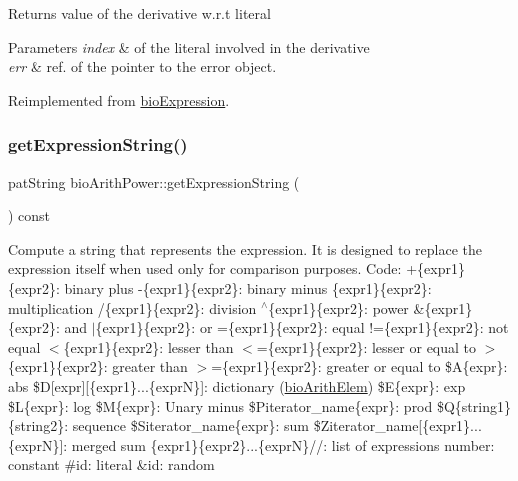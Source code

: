 \begin{DoxyReturn}{Returns}
value of the derivative w.\+r.\+t literal 
\end{DoxyReturn}

\begin{DoxyParams}{Parameters}
{\em index} & of the literal involved in the derivative \\
\hline
{\em err} & ref. of the pointer to the error object. \\
\hline
\end{DoxyParams}


Reimplemented from \hyperlink{classbio_expression_a5915579d1193f25f216c1e273c97f2ce}{bio\+Expression}.

\mbox{\label{classbio_arith_power_a90e7e9f398760b8c8f928ecfb7d7c3d3}} 
\subsubsection{\texorpdfstring{get\+Expression\+String()}{getExpressionString()}}
{\footnotesize\ttfamily pat\+String bio\+Arith\+Power\+::get\+Expression\+String (\begin{DoxyParamCaption}{ }\end{DoxyParamCaption}) const\hspace{0.3cm}{\ttfamily [virtual]}}

Compute a string that represents the expression. It is designed to replace the expression itself when used only for comparison purposes. Code\+: +\{expr1\}\{expr2\}\+: binary plus -\/\{expr1\}\{expr2\}\+: binary minus \{expr1\}\{expr2\}\+: multiplication /\{expr1\}\{expr2\}\+: division $^\wedge$\{expr1\}\{expr2\}\+: power \&\{expr1\}\{expr2\}\+: and $\vert$\{expr1\}\{expr2\}\+: or =\{expr1\}\{expr2\}\+: equal !=\{expr1\}\{expr2\}\+: not equal $<$\{expr1\}\{expr2\}\+: lesser than $<$=\{expr1\}\{expr2\}\+: lesser or equal to $>$\{expr1\}\{expr2\}\+: greater than $>$=\{expr1\}\{expr2\}\+: greater or equal to \$A\{expr\}\+: abs \$D\mbox{[}expr\mbox{]}\mbox{[}\{expr1\}...\{exprN\}\mbox{]}\+: dictionary (\hyperlink{classbio_arith_elem}{bio\+Arith\+Elem}) \$E\{expr\}\+: exp \$L\{expr\}\+: log \$M\{expr\}\+: Unary minus \$\+Piterator\+\_\+name\{expr\}\+: prod \$Q\{string1\}\{string2\}\+: sequence \$\+Siterator\+\_\+name\{expr\}\+: sum \$\+Ziterator\+\_\+name\mbox{[}\{expr1\}...\{exprN\}\mbox{]}\+: merged sum \{expr1\}\{expr2\}...\{exprN\}//\+: list of expressions number\+: constant \#id\+: literal \&id\+: random 

